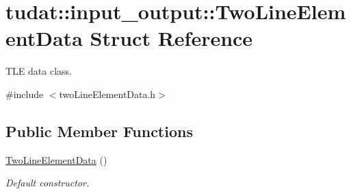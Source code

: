 \hypertarget{structtudat_1_1input__output_1_1TwoLineElementData}{}\section{tudat\+:\+:input\+\_\+output\+:\+:Two\+Line\+Element\+Data Struct Reference}
\label{structtudat_1_1input__output_1_1TwoLineElementData}


T\+LE data class.  




{\ttfamily \#include $<$two\+Line\+Element\+Data.\+h$>$}

\subsection*{Public Member Functions}
\begin{DoxyCompactItemize}
\item 
\hyperlink{structtudat_1_1input__output_1_1TwoLineElementData_a365b54d66d21fe6383ec3e840e8ad06e}{Two\+Line\+Element\+Data} ()
\begin{DoxyCompactList}\small\item\em Default constructor. \end{DoxyCompactList}\end{DoxyCompactItemize}
